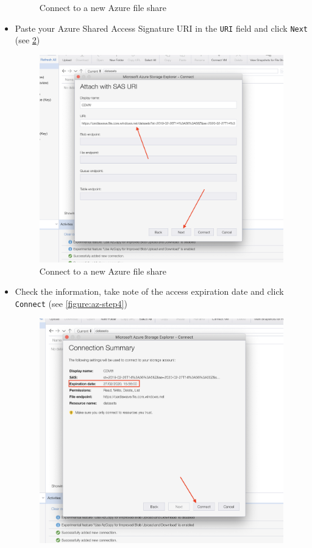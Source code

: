 \begin{itemize}
\begin{figure}
        \caption{Connect to a new Azure file share}
        \label{figure:az-step2}
        \end{figure}
    \item Paste your Azure Shared Access Signature URI in the \texttt{URI} field and click \texttt{Next} (see \ref{figure:az-step3})
        \begin{figure}
        \includegraphics[width=\textwidth]{assets/az-step3.png}
        \caption{Connect to a new Azure file share}
        \label{figure:az-step3}
        \end{figure}
    \item Check the information, take note of the access expiration date and click \texttt{Connect} (see \ref{figure:az-step4})
        \begin{figure}
        \includegraphics[width=\textwidth]{assets/az-step4.png}

\end{figure}
\end{itemize}
